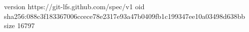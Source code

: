 version https://git-lfs.github.com/spec/v1
oid sha256:088c3f183367006ccece78e2317e93a47b0409fb1c199347ee10a03498d638bb
size 16797
